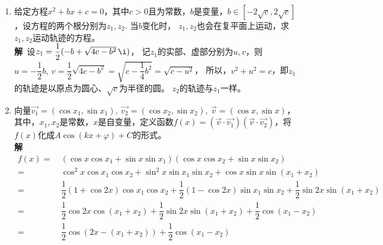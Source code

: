\begin{enumerate}[label={【\textbf{例\thechapter.\arabic*}】},
 leftmargin=\inteval{\myenumleftmargin}pt,
 itemsep=\inteval{\myenumitempsep}pt,
 itemindent=\inteval{\myenumitemindent}pt]
\begin{align*}
    \begin{cases}
        a^2+b^2=1 & \mycircled{1}\\ 
        c^2+d^2=1 & \mycircled{2}\\
        a+c=\dfrac{1}{2} &\mycircled{3}\\ 
        b+d=\dfrac{\sqrt{3}}{2} & \mycircled{4}
    \end{cases}
\end{align*}
用$ - $可得：
\begin{align*}
    a^2-c^2 &=d^2-b^2 \\
    (a-c)\underbrace{(a+c)}_{\frac{1}{2}} &
    =(d-b)\underbrace{(d+b)}_{\frac{\sqrt{3}}{2}}   \\
    a-c&=\sqrt{3}(d-b)\q \mycircled{5}
\end{align*}
又由,可得：
\begin{align*}
    a+c=\dfrac{\sqrt{3}}{3}(d+b)\q \mycircled{6}
\end{align*} 
由,解得$ a=\dfrac{\sqrt{3}}{3}(2d-b) $，
代入可得：$ \dfrac{4}{3}(b^2-bd+d^2)=1 $. 另外，
$ (b+d)^2=b^2+2bd+d^2=\dfrac{3}{4} $，于是得到$ bd=0 $，
与联立可解得$ b=0,\ \dfrac{\sqrt{3}}{2} $.余下省略。

\item 给定方程$ x^2+bx+c=0 $，其中$ c>0 $且为常数，$ b $是变量，$ b\in [-2\sqrt{c},
2\sqrt{c}] $，设方程的两个根分别为$ z_1,z_2 $. 当$ b $变化时，
$ z_1,z_2 $也会在复平面上运动，求$ z_1,z_2 $运动轨迹的方程。\\
\textbf{解}\ 设$ z_1=\dfrac{1}{2}(-b+\sqrt{4c-b^2}\, \i) $，
记$ z_1 $的实部、虚部分别为$ u,v $，则$ u=-\dfrac{1}{2}b,\ 
v=\dfrac{1}{2}\sqrt{4c-b^2}=\sqrt{c-\dfrac{1}{4}b^2}=\sqrt{c-u^2} $，
所以，$ v^2+u^2=c $，即$ z_1 $的轨迹是以原点为圆心、$ \sqrt{c} $为半径的圆。
$ z_2 $的轨迹与$ z_1 $一样。

\item 向量$ \vec{v_1}=(\cos x_1,\sin x_1),\ \vec{v_2}=
(\cos x_2,\sin x_2),\ \vec{v}=(\cos x,\sin x) $，
其中，$  x_1, x_2 $是常数，$ x $是自变量，定义函数$ f(x)=
(\vec{v}\cdot \vec{v_1})(\vec{v}\cdot
\vec{v_2}) $，将$ f( x) $化成$ A\cos(k x+\varphi)+C $的形式。\\
\textbf{解}\ 
\begin{align*}
    f(x)=&\ (\cos x\cos x_1+\sin x\sin x_1)(\cos x\cos x_2+\sin x\sin x_2) \\
    =&\ \cos^2x\cos x_1\cos x_2+\sin^2x\sin x_1\sin x_2+\cos x\sin x\sin(x_1+x_2) \\
    =&\ \dfrac{1}{2}(1+\cos2x)\cos x_1\cos x_2+\dfrac{1}{2}(1-\cos2x)\sin x_1\sin x_2
    +\dfrac{1}{2}\sin2x\sin(x_1+x_2) \\
    =&\  \dfrac{1}{2}\cos2x\cos(x_1+x_2)+\dfrac{1}{2}\sin2x\sin(x_1+x_2)
    +\dfrac{1}{2}\cos(x_1-x_2) \\
    =&\  \dfrac{1}{2}\cos(2x-(x_1+x_2))+\dfrac{1}{2}\cos(x_1-x_2)
\end{align*}


\end{enumerate}
